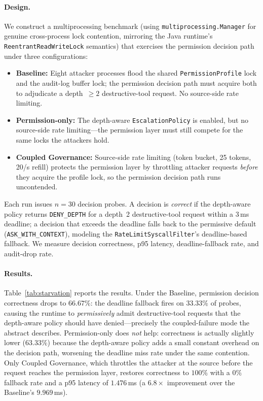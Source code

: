 \paragraph{Design.}
We construct a multiprocessing benchmark (using
\texttt{multiprocessing.Manager} for genuine cross-process lock
contention, mirroring the Java runtime's \texttt{ReentrantReadWriteLock}
semantics) that exercises the permission decision path under three
configurations:
\begin{itemize}
    \item \textbf{Baseline:} Eight attacker processes flood the shared
    \texttt{PermissionProfile} lock and the audit-log buffer lock; the
    permission decision path must acquire both to adjudicate a
    depth~$\geq 2$ destructive-tool request. No source-side rate limiting.
    \item \textbf{Permission-only:} The depth-aware \texttt{EscalationPolicy}
    is enabled, but no source-side rate limiting---the permission layer
    must still compete for the same locks the attackers hold.
    \item \textbf{Coupled Governance:} Source-side rate limiting
    (token bucket, 25 tokens, 20/s refill) protects the permission layer
    by throttling attacker requests \emph{before} they acquire the profile
    lock, so the permission decision path runs uncontended.
\end{itemize}
Each run issues $n=30$ decision probes. A decision is \emph{correct} if
the depth-aware policy returns \texttt{DENY\_DEPTH} for a depth~2
destructive-tool request within a 3\,ms deadline; a decision that
exceeds the deadline falls back to the permissive default
(\texttt{ASK\_WITH\_CONTEXT}), modeling the
\texttt{RateLimitSyscallFilter}'s deadline-based fallback. We measure
decision correctness, p95 latency, deadline-fallback rate, and audit-drop
rate.

\paragraph{Results.}
Table~\ref{tab:starvation} reports the results. Under the Baseline,
permission decision correctness drops to $66.67\%$: the deadline
fallback fires on $33.33\%$ of probes, causing the runtime to
\emph{permissively} admit destructive-tool requests that the
depth-aware policy should have denied---precisely the coupled-failure
mode the abstract describes. Permission-only does \emph{not} help:
correctness is actually slightly lower ($63.33\%$) because the
depth-aware policy adds a small constant overhead on the decision
path, worsening the deadline miss rate under the same contention.
Only Coupled Governance, which throttles the attacker at the source
before the request reaches the permission layer, restores correctness
to $100\%$ with a $0\%$ fallback rate and a p95 latency of $1.476$\,ms
(a $6.8\times$ improvement over the Baseline's $9.969$\,ms).

